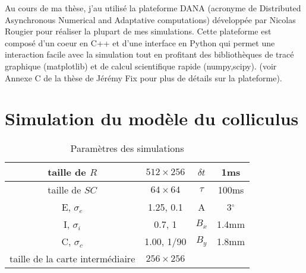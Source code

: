 \DontNumberThisInToc
\DontFrameThisInToc
{} 

Au cours de ma thèse, j'au utilisé la plateforme DANA (acronyme de Distributed Asynchronous Numerical and Adaptative computations) développée par Nicolas Rougier pour réaliser la plupart de mes simulations. Cette plateforme est composé d'un coeur en C++ et d'une interface en Python qui permet une interaction facile avec la simulation tout en profitant des bibliothèques de tracé graphique (matplotlib) et de calcul scientifique rapide (numpy,scipy). (voir Annexe C de la thèse de Jérémy Fix \cite{Fix:2008} pour plus de détails sur la plateforme).

\section{Simulation du modèle du colliculus}
\begin{table}[h]
  \begin{center}
    \begin{tabular}{|c|c||c|c|}

      \hline
      taille de $R$        & $512 \times 256$   & $\delta t$        & 1ms    \\
\hline
      taille de $SC$      & $64 \times 64$    &  $\tau$  & 100ms    \\
 \hline     E, $\sigma_e$ &  1.25, 0.1                 & A         & 3$^\circ$ \\
\hline      I, $\sigma_i$ &  0.7, 1                   & $B_x$     & 1.4mm    \\
\hline      C, $\sigma_c$ &  1.00, 1/90             & $B_y$     & 1.8mm    \\
\hline      taille de la carte intermédiaire        &$256 \times 256$  & &   \\  
      \hline
    \end{tabular}
  \end{center}
\caption{Paramètres des simulations}
\label{param}
\end{table}
